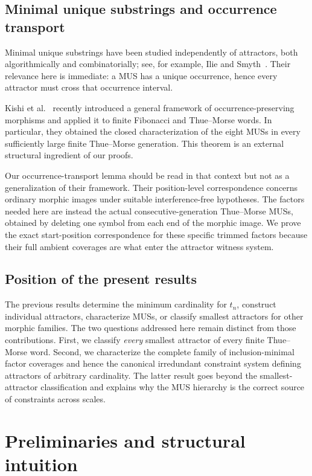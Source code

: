 \documentclass[10pt,a4paper]{article}
\theoremstyle{definition}\newtheorem{definition}[theorem]{Definition}
\theoremstyle{remark}\newtheorem{remark}[theorem]{Remark}
\begin{document}
\subsection{Minimal unique substrings and occurrence transport}
Minimal unique substrings have been studied independently of attractors, both algorithmically and combinatorially; see, for example, Ilie and Smyth~\cite{IlieSmyth2011}. Their relevance here is immediate: a MUS has a unique occurrence, hence every attractor must cross that occurrence interval.

Kishi et al.~\cite{Kishi2026} recently introduced a general framework of occurrence-preserving morphisms and applied it to finite Fibonacci and Thue--Morse words. In particular, they obtained the closed characterization of the eight MUSs in every sufficiently large finite Thue--Morse generation. This theorem is an external structural ingredient of our proofs.

Our occurrence-transport lemma should be read in that context but not as a generalization of their framework. Their position-level correspondence concerns ordinary morphic images under suitable interference-free hypotheses. The factors needed here are instead the actual consecutive-generation Thue--Morse MUSs, obtained by deleting one symbol from each end of the morphic image. We prove the exact start-position correspondence for these specific trimmed factors because their full ambient coverages are what enter the attractor witness system.

\subsection{Position of the present results}
The previous results determine the minimum cardinality for $t_n$, construct individual attractors, characterize MUSs, or classify smallest attractors for other morphic families. The two questions addressed here remain distinct from those contributions. First, we classify \emph{every} smallest attractor of every finite Thue--Morse word. Second, we characterize the complete family of inclusion-minimal factor coverages and hence the canonical irredundant constraint system defining attractors of arbitrary cardinality. The latter result goes beyond the smallest-attractor classification and explains why the MUS hierarchy is the correct source of constraints across scales.

\section{Preliminaries and structural intuition}
\label{sec:preliminaries}
\end{document}
